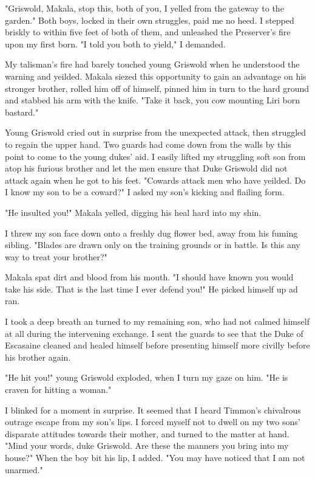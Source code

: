 \documentclass{article}
\begin{document}
"Griswold, Makala, stop this, both of you, I yelled from the gateway to the garden." Both boys, locked in their own struggles, paid me no heed. I stepped briskly to within five feet of both of them, and unleashed the Preserver's fire upon my first born.  "I told you both to yield," I demanded. 

My talisman's fire had barely touched young Griswold when he understood the warning and yeilded. Makala siezed this opportunity to gain an advantage on his stronger brother, rolled him off of himself, pinned him in turn to the hard ground and stabbed his arm with the knife. "Take it back, you cow mounting Liri born bastard." 

Young Griswold cried out in surprise from the unexpected attack, then struggled to regain the upper hand. Two guards had come down from the walls by this point to come to the young dukes' aid. I easily lifted my struggling soft son from atop his furious brother and let the men ensure that Duke Griswold did not attack again when he got to his feet. "Cowards attack men who have yeilded. Do I know my son to be a coward?" I asked my son's kicking and flailing form.

"He insulted you!" Makala yelled, digging his heal hard into my shin.

I threw my son face down onto a freshly dug flower bed, away from his fuming sibling. "Blades are drawn only on the training grounds or in battle. Is this any way to treat your brother?"

Makala spat dirt and blood from his mouth. "I should have known you would take his side. That is the last time I ever defend you!" He picked himself up ad ran. 

I took a deep breath an turned to my remaining son, who had not calmed himself at all during the intervening exchange. I sent the guards to see that the Duke of Escasaine cleaned and healed himself before presenting himself more civilly before his brother again. 

"He hit you!" young Griswold exploded, when I turn my gaze on him. "He is craven for hitting a woman."

I blinked for a moment in surprise. It seemed that I heard Timmon's chivalrous outrage escape from my son's lips. I forced myself not to dwell on my two sons' disparate attitudes towards their mother, and turned to the matter at hand. "Mind your words, duke Griswold. Are these the manners you bring into my house?" When the boy bit his lip, I added. "You may have noticed that I am not unarmed."
\end{document}
